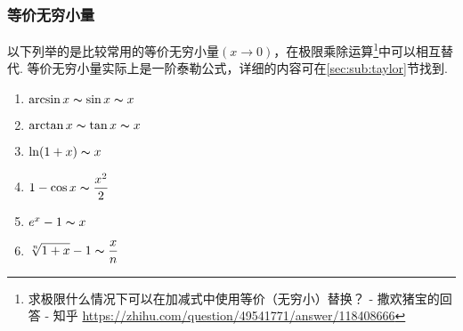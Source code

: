 \subsubsection{等价无穷小量}
\label{sec:sub:eq_equivalent_infinitesimal}
以下列举的是比较常用的等价无穷小量$(x\to 0)$，在极限乘除运算\footnote{求极限什么情况下可以在加减式中使用等价（无穷小）替换？ - 撒欢猪宝的回答 - 知乎 \url{https://zhihu.com/question/49541771/answer/118408666}}中可以相互替代.
等价无穷小量实际上是一阶泰勒公式，详细的内容可在\ref{sec:sub:taylor}节找到.
\begin{enumerate}
	\itemsep -3pt
	\item $\arcsin x\thicksim\sin x\thicksim x$
	\item $\arctan x\thicksim\tan x\thicksim x$
	\item $\ln(1+x)\thicksim x$
	\item $\displaystyle 1-\cos x\thicksim\frac{x^2}{2}$
	\item $e^x-1\thicksim x$
	\item $\displaystyle \sqrt[n]{1+x}-1\thicksim\frac{x}{n}$
\end{enumerate}

